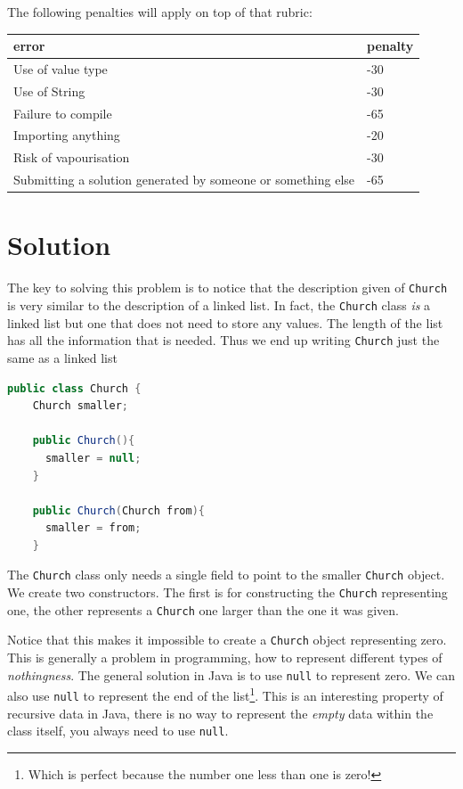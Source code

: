 \documentclass[twoside=false,DIV=14]{scrartcl}
\begin{document}
The following penalties will apply on top of that rubric:

\begin{tabular}{ll}
\textbf{error} & \textbf{penalty} \\
\hline
Use of value type & -30 \\
Use of String & -30 \\
Failure to compile & -65 \\
Importing anything & -20 \\
Risk of vapourisation & -30 \\
Submitting a solution generated by someone or something else & -65 \\
\end{tabular}

\newpage
\section{Solution}

The key to solving this problem is to notice that the description given of \lstinline{Church} is very similar to the description of a linked list.  In fact, the \lstinline{Church} class \emph{is} a linked list but one that does not need to store any values.  The length of the list has all the information that is needed.  Thus we end up writing \lstinline{Church} just the same as a linked list

\begin{lstlisting}[language=java]
  public class Church {
    Church smaller;
    
    public Church(){
      smaller = null;
    }
    
    public Church(Church from){
      smaller = from;
    }
\end{lstlisting}

The \lstinline{Church} class only needs a single field to point to the smaller \lstinline{Church} object.  We create two constructors.  The first is for constructing the \lstinline{Church} representing one, the other represents a \lstinline{Church} one larger than the one it was given.

Notice that this makes it impossible to create a \lstinline{Church} object representing zero. This is generally a problem in programming, how to represent different types of \emph{nothingness}.  The general solution in Java is to use \lstinline{null} to represent zero.  We can also use \lstinline{null} to represent the end of the list\footnote{Which is perfect because the number one less than one is zero!}.  This is an interesting property of recursive data in Java, there is no way to represent the \emph{empty} data within the class itself, you always need to use \lstinline{null}.
\end{document}
